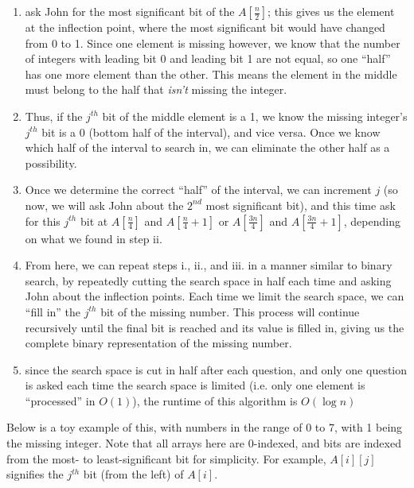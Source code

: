 \documentclass[12pt]{article}
\begin{document}
\begin{enumerate}
\begin{enumerate}
        \begin{enumerate}
            \item ask John for the most significant bit of the $A[\frac{n}{2}]$; this gives us 
            the element at the inflection point, where the most significant bit would have changed from 0 to 1. Since one 
            element is missing however, we know that the number of integers with leading bit 0 and leading bit 1 are not equal, 
            so one ``half'' has one more element than the other. This means the element in the middle must belong to the half 
            that \textit{isn't} missing the integer.
            \item Thus, if the $j^{th}$ bit of the middle element is a 1, we know the missing integer's $j^{th}$ bit is a 0 
            (bottom half of the interval), and vice versa. Once we know which half of the interval to search in, we can eliminate 
            the other half as a possibility.
            \item Once we determine the correct ``half'' of the interval, we can increment $j$ (so now, we will ask John about the $2^{nd}$ 
            most significant bit), and this time ask for this $j^{th}$ bit at $A[\frac{n}{4}]$ and $A[\frac{n}{4} + 1]$ or 
            $A[\frac{3n}{4}]$ and $A[\frac{3n}{4} + 1]$, depending on what we found in step ii.
            \item From here, we can repeat steps i., ii., and iii. in a manner similar to binary search, by repeatedly cutting 
            the search space in half each time and asking John about the inflection points. Each time we limit the search space, 
            we can ``fill in'' the $j^{th}$ bit of the missing number. This process will continue recursively until the final bit is 
            reached and its value is filled in, giving us the complete binary representation of the missing number.
            \item since the search space is cut in half after each question, and only one question is asked each time the 
            search space is limited (i.e. only one element is ``processed'' in $O(1)$), the runtime of this algorithm is $O(\log n)$
        \end{enumerate}

        \newpage

        Below is a toy example of this, with numbers in the range of 0 to 7, with 1 being the missing integer. Note that all arrays here 
        are 0-indexed, and bits are indexed from the most- to least-significant bit for simplicity. For example, $A[i][j]$ signifies the $j^{th}$ bit 
        (from the left) of $A[i]$.


\end{enumerate}
\end{enumerate}
\end{document}
